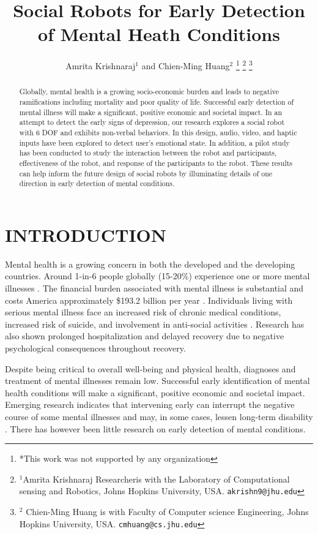 \documentclass[letterpaper, 10 pt, conference]{ieeeconf}  %
\title{\LARGE \bf
Social Robots for Early Detection of Mental Heath Conditions
}
\author{Amrita Krishnaraj$^{1}$ and Chien-Ming Huang$^{2}$%
\thanks{*This work was not supported by any organization}%
\thanks{$^{1}$Amrita Krishnaraj Researcheris with the Laboratory of Computational sensing and Robotics,
        Johns Hopkins University, USA.
        {\tt\small akrishn9@jhu.edu}}%
\thanks{$^{2}$ Chien-Ming Huang is with Faculty of Computer science Engineering, Johns Hopkins University, USA.
        {\tt\small cmhuang@cs.jhu.edu}}%
}
\begin{document}
\maketitle
\thispagestyle{empty}
\pagestyle{empty}


\begin{abstract}

Globally, mental health is a growing socio-economic burden and leads to negative ramifications including mortality and poor quality of life. Successful early detection of mental illness will make a significant, positive economic and societal impact. In an attempt to detect the early signs of depression, our research explores a social robot with 6 DOF and exhibits non-verbal behaviors. In this design, audio, video, and haptic inputs have been explored to detect user's emotional state. In addition, a pilot study has been conducted to study the interaction between the robot and participants, effectiveness of the robot, and response of the participants to the robot. These results can help inform the future design of social robots by illuminating details of one direction in early detection of mental conditions.

\end{abstract}


\section{INTRODUCTION}

Mental health is a growing concern in both the developed and the developing countries. Around 1-in-6 people globally (15-20\%) experience one or more mental illnesses \cite{r1}. The financial burden associated with mental illness is substantial and costs America approximately \$193.2 billion per year \cite{r3}. Individuals living with serious mental illness face an increased risk of chronic medical conditions, increased risk of suicide, and involvement in anti-social activities \cite{r5}. Research has also shown prolonged hospitalization and delayed recovery due to negative psychological consequences throughout recovery.

Despite being critical to overall well-being and physical health, diagnoses and treatment of mental illnesses remain low. Successful early identification of mental health conditions will make a significant, positive economic and societal impact. Emerging research indicates that intervening early can interrupt the negative course of some mental illnesses and may, in some cases, lessen long-term disability \cite{r2}. There has however been little research on early detection of mental conditions. 
\end{document}
